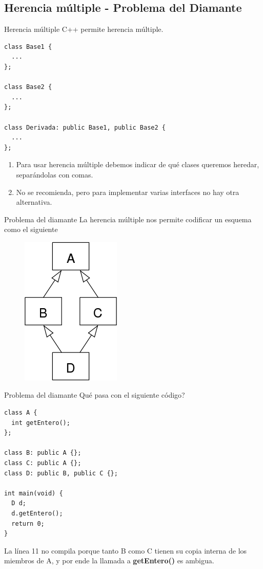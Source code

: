 \subsection{Herencia m\'ultiple - Problema del Diamante}
\begin{frame}{Herencia m\'ultiple}{
  C++ permite herencia m\'ultiple.
}
   \begin{lstlisting}[style=normal,firstnumber=1,linebackgroundcolor={%
           \btLstHLB<1>{9}%
   }]
class Base1 {
  ...
};

class Base2 {
  ...
};

class Derivada: public Base1, public Base2 {
  ...
};

   \end{lstlisting}
   \begin{enumerate}
      \item Para usar herencia m\'ultiple debemos indicar de qu\'e clases queremos heredar, separ\'andolas con comas.
      \item No se recomienda, pero para implementar varias interfaces no hay otra alternativa.
   \end{enumerate}
\end{frame}

\begin{frame}{Problema del diamante}{
   La herencia m\'ultiple nos permite codificar un esquema como el siguiente
}
   \begin{figure}
      \centering
      \includegraphics[height=0.5\textheight]{./Diamond_inheritance.png}
   \end{figure}
\end{frame}

\begin{frame}{Problema del diamante}{
  Qu\'e pasa con el siguiente c\'odigo?
}
   \begin{lstlisting}[style=normal,firstnumber=1,linebackgroundcolor={%
           \btLstHLR<1>{11}%
   }]
class A {
  int getEntero();
};

class B: public A {};
class C: public A {};
class D: public B, public C {};

int main(void) {
  D d;
  d.getEntero();
  return 0;
}

   \end{lstlisting}

   La l\'inea 11 no compila porque tanto B como C tienen su copia interna de los miembros de A, y por ende la llamada a \textbf{getEntero()} es ambigua.
\end{frame}

